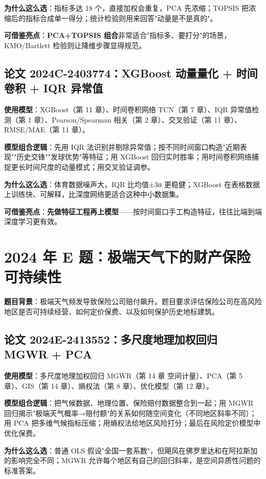 \textbf{为什么这么选}：指标多达 18 个，直接加权会重复，PCA 先浓缩；TOPSIS 把浓缩后的指标合成单一得分；统计检验则用来回答"动量是不是真的"。

\textbf{可借鉴亮点}：\textbf{PCA+TOPSIS 组合}非常适合"指标多、要打分"的场景，KMO/Bartlett 检验则让降维步骤显得规范。

\subsection{论文 2024C-2403774：XGBoost 动量量化 + 时间卷积 + IQR 异常值}
\textbf{使用模型}：XGBoost（第 11 章）、时间卷积网络 TCN（第 7 章）、IQR 异常值检测（第 1 章）、Pearson/Spearman 相关（第 2 章）、交叉验证（第 11 章）、RMSE/MAE（第 11 章）。

\textbf{模型组合逻辑}：先用 IQR 法识别并剔除异常值；按不同时间窗口构造"近期表现""历史交锋""发球优势"等特征；用 XGBoost 回归实时胜率；用时间卷积网络捕捉更长时间尺度的动量模式；用交叉验证调参。

\textbf{为什么这么选}：体育数据噪声大，IQR 比均值±3σ 更稳健；XGBoost 在表格数据上训练快、可解释，比深度网络更适合这种中小数据集。

\textbf{可借鉴亮点}：\textbf{先做特征工程再上模型}——按时间窗口手工构造特征，往往比端到端深度学习更有效。

\section{2024 年 E 题：极端天气下的财产保险可持续性}

\textbf{题目背景}：极端天气频发导致保险公司赔付飙升。题目要求评估保险公司在高风险地区是否可持续经营、如何定价保费、以及如何保护历史地标建筑。

\subsection{论文 2024E-2413552：多尺度地理加权回归 MGWR + PCA}
\textbf{使用模型}：多尺度地理加权回归 MGWR（第 14 章 空间计量）、PCA（第 5 章）、GIS（第 14 章）、熵权法（第 8 章）、优化模型（第 12 章）。

\textbf{模型组合逻辑}：把气候数据、地理位置、保险赔付数据整合到一起；用 MGWR 回归揭示"极端天气概率→赔付额"的关系如何随空间变化（不同地区斜率不同）；用 PCA 把多维气候指标压缩；用熵权法给地区风险打分；最后在风险定价模型中优化保费。

\textbf{为什么这么选}：普通 OLS 假设"全国一套系数"，但飓风在佛罗里达和在阿拉斯加的影响完全不同；MGWR 允许每个地区有自己的回归斜率，是空间异质性问题的标准答案。

